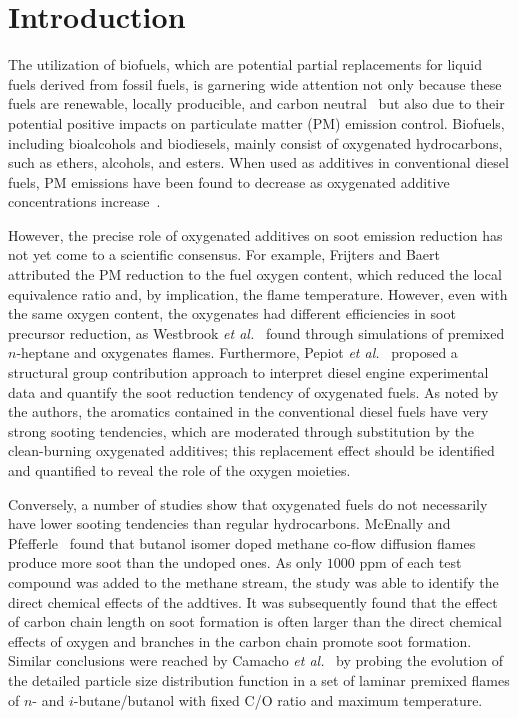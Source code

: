 \documentclass[review,3p,times]{elsarticleUS}
\begin{document}
\section{Introduction}

The utilization of biofuels, which are potential partial replacements for liquid fuels derived from fossil fuels, is garnering wide attention not only because these fuels are renewable, locally producible, and carbon neutral~\cite{liu11} but also due to their potential positive impacts on particulate matter (PM) emission control. Biofuels, including bioalcohols and biodiesels, mainly consist of oxygenated hydrocarbons, such as ethers, alcohols, and esters. When used as additives in conventional diesel fuels, PM emissions have been found to decrease as oxygenated additive concentrations increase~\cite{graboski98}. 

However, the precise role of oxygenated additives on soot emission reduction has not yet come to a scientific consensus. For example, Frijters and Baert~\cite{frijters06} attributed the PM reduction to the fuel oxygen content, which reduced the local equivalence ratio and, by implication, the flame temperature.  However, even with the same oxygen content, the oxygenates had different efficiencies in soot precursor reduction, as Westbrook \emph{et al.}~\cite{westbrook06} found through simulations of premixed $n$-heptane and oxygenates flames.  Furthermore, Pepiot \emph{et al.}~\cite{pepiot08} proposed a structural group contribution approach to interpret diesel engine experimental data and quantify the soot reduction tendency of oxygenated fuels.  As noted by the authors, the aromatics contained in the conventional diesel fuels have very strong sooting tendencies, which are moderated through substitution by the clean-burning oxygenated additives; this replacement effect should be identified and quantified to reveal the role of the oxygen moieties. 

Conversely, a number of studies show that oxygenated fuels do not necessarily have lower sooting tendencies than regular hydrocarbons.  McEnally and Pfefferle~\cite{mcenally05,mcenally11} found that butanol isomer doped methane co-flow diffusion flames produce more soot than the undoped ones.  As only $1000$ ppm of each test compound was added to the methane stream, the study was able to identify the direct chemical effects of the addtives.  It was subsequently found that the effect of carbon chain length on soot formation is often larger than the direct chemical effects of oxygen and branches in the carbon chain promote soot formation.  Similar conclusions were reached by Camacho \emph{et al.}~\cite{camacho13} by probing the evolution of the detailed particle size distribution function in a set of laminar premixed flames of $n$- and $i$-butane/butanol with fixed C/O ratio and maximum temperature. 
\end{document}
